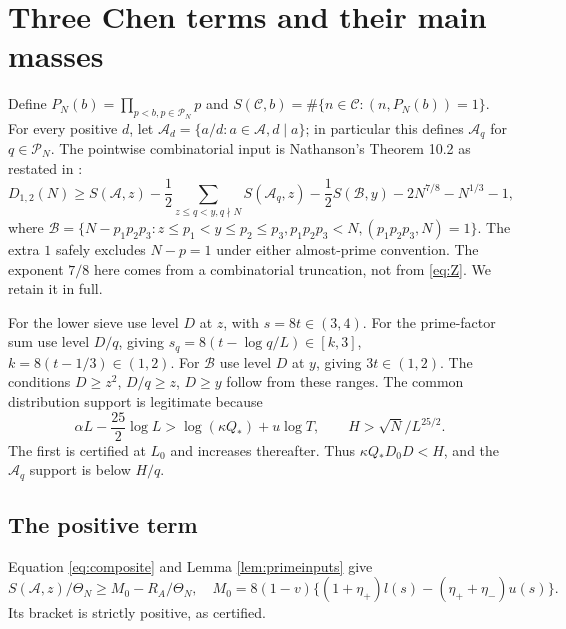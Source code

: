 \documentclass[11pt]{article}
\theoremstyle{remark}\newtheorem{remark}[theorem]{Remark}
\newcommand{\A}{\mathcal A}
\newcommand{\B}{\mathcal B}
\newcommand{\PP}{\mathcal P_N}
\newcommand{\Th}{\Theta_N}
\begin{document}
\section{Three Chen terms and their main masses}\label{sec:three}
Define $P_N(b)=\prod_{p<b,p\in\PP}p$ and
$S(\mathcal C,b)=\#\{n\in\mathcal C:(n,P_N(b))=1\}$.
For every positive $d$, let $\A_d=\{a/d:a\in\A,d\mid a\}$;
in particular this defines $\A_q$ for $q\in\PP$.
The pointwise combinatorial input is Nathanson's Theorem 10.2 as
restated in \cite[Lemma 37, source label \texttt{lem:>}]{BJS}:
\begin{equation}\label{eq:Chen}
D_{1,2}(N)\ge S(\A,z)-\frac12\sum_{z\le q<y,q\nmid N}S(\A_q,z)
-\frac12S(\B,y)-2N^{7/8}-N^{1/3}-1,
\end{equation}
where $\B=\{N-p_1p_2p_3:z\le p_1<y\le p_2\le p_3,
p_1p_2p_3<N,(p_1p_2p_3,N)=1\}$.
The extra $1$ safely excludes $N-p=1$ under either almost-prime convention.
The exponent $7/8$ here comes from a combinatorial truncation, not from
\eqref{eq:Z}. We retain it in full.

For the lower sieve use level $D$ at $z$, with $s=8t\in(3,4)$.
For the prime-factor sum use level $D/q$, giving
$s_q=8(t-\log q/L)\in[k,3]$, $k=8(t-1/3)\in(1,2)$.
For $\B$ use level $D$ at $y$, giving $3t\in(1,2)$.
The conditions $D\ge z^2$, $D/q\ge z$, $D\ge y$ follow from these ranges.
The common distribution support is legitimate because
\begin{equation}\label{eq:support}
\alpha L-\frac{25}2\log L>\log(\kappa Q_*)+u\log T,
\qquad H>\sqrt N/L^{25/2}.
\end{equation}
The first is certified at $L_0$ and increases thereafter. Thus
$\kappa Q_*D_0D<H$, and the $\A_q$ support is below $H/q$.

\subsection{The positive term}
Equation \eqref{eq:composite} and Lemma \ref{lem:primeinputs} give
\[
S(\A,z)/\Th\ge M_0-R_A/\Th,
\quad M_0=8(1-v)\{(1+\eta_+)l(s)-(\eta_++\eta_-)u(s)\}.
\]
Its bracket is strictly positive, as certified.
\end{document}
